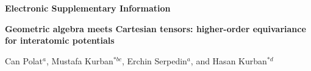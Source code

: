 \documentclass[twoside,9pt]{extarticle}
\renewcommand{\refname}{Notes and references}
\begin{document}
\makeatletter
\newlength{\figrulesep}
\setlength{\figrulesep}{0.5\textfloatsep}
\newcommand{\topfigrule}{\vspace*{-1pt}%
\noindent{\color{cream}\rule[-\figrulesep]{\columnwidth}{1.5pt}} }
\newcommand{\botfigrule}{\vspace*{-2pt}%
\noindent{\color{cream}\rule[\figrulesep]{\columnwidth}{1.5pt}} }
\newcommand{\dblfigrule}{\vspace*{-1pt}%
\noindent{\color{cream}\rule[-\figrulesep]{\textwidth}{1.5pt}} }
\makeatother
\renewcommand{\dblfigrule}{}

\renewcommand{\thesection}{S\arabic{section}}
\renewcommand{\thetable}{S\arabic{table}}
\renewcommand{\thefigure}{S\arabic{figure}}
\renewcommand{\theequation}{S\arabic{equation}}


{\sffamily
\begin{center}

{\LARGE\bfseries Electronic Supplementary Information\par}

\vspace{0.25cm}

{\Large\bfseries
Geometric algebra meets Cartesian tensors: higher-order equivariance for interatomic potentials\par}

\vspace{0.30cm}

{\large
Can Polat$^{a}$, Mustafa Kurban$^{*bc}$, Erchin Serpedin$^{a}$, and Hasan Kurban$^{*d}$\par}

\end{center}
}
\vspace{0.55cm}

\renewcommand*\rmdefault{bch}\normalfont\upshape
\rmfamily



\renewcommand\refname{Notes and references}


\end{document}
